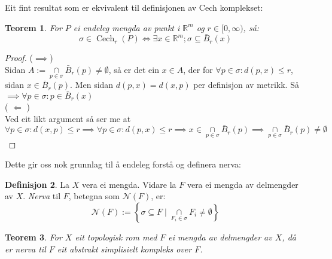 \documentclass[a4paper, 12pt, norsk]{article}
\theoremstyle{plain}
\newtheorem{theorem}{Teorem}[section]
\theoremstyle{definition}
\newtheorem{definition}[theorem]{Definisjon}
\newcommand{\Rb}{\mathbb{R}}
\newcommand{\Nc}{\mathcal{N}}
\DeclareMathOperator{\Cech}{Cech}
\newcommand{\intersect}{ \mathop{\cap}\limits } %
\begin{document}
Eit fint resultat som er ekvivalent til definisjonen av Cech komplekset:

\begin{theorem}
	For $P$ ei endeleg mengda av punkt i $\Rb^m$ og $r\in[0, \infty)$, så:
	\begin{equation*}
		\sigma\in \Cech_r(P) \Longleftrightarrow \exists x\in\Rb^m; \sigma \subseteq \bar{B}_r(x)
	\end{equation*}
\end{theorem}

\begin{proof}
	($\implies$)
	\\Sidan $A:=\intersect_{p\in\sigma}\bar{B}_r(p)\neq\emptyset$, så er det ein $x\in A$, der for $\forall p\in\sigma: d(p,x)\leq r$, sidan $x\in\bar{B}_r(p)$.
	Men sidan $d(p,x)=d(x,p)$ per definisjon av metrikk. 
	Så $\implies \forall p\in\sigma: p \in \bar{B}_r(x)$
	\\( \( \Longleftarrow \) )
	\\Ved eit likt argument så ser me at  $\forall p \in \sigma : d(x, p) \leq r \implies \forall p \in \sigma : d(p, x) \leq r \implies x \in \intersect_{p \in \sigma} \bar{B}_r(p) \implies \intersect_{p \in \sigma} \bar{B}_r(p) \neq \emptyset$
\end{proof}

Dette gir oss nok grunnlag til å endeleg forstå og definera nerva:

\begin{definition} %
	La $X$ vera ei mengda. Vidare la $F$ vera ei mengda av delmengder av $X$. \emph{Nerva} til $F$, betegna som $\Nc(F)$, er:
	\begin{equation*}
		\Nc(F) := \left \{ \sigma \subseteq F \mid \intersect_{ F_i \in \sigma } F_i \neq \emptyset \right \}
	\end{equation*}
\end{definition}

\begin{theorem}
	For $X$ eit topologisk rom med $F$ ei mengda av delmengder av $X$, då er nerva til $F$ eit abstrakt simplisielt kompleks over $F$.
\end{theorem}
\end{document}
